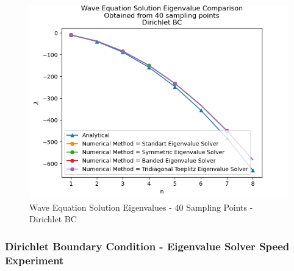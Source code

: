 \documentclass[letterpaper,12pt]{article}
\begin{document}
\begin{figure}[H]
\centerline{\includegraphics[width=\linewidth]{figures/2_40_d_eigenvalue.png}}
\caption{Wave Equation Solution Eigenvalues - 40 Sampling Points - Dirichlet BC}
\label{fig:2_40_d_eigenvalue}
\end{figure}
    

\subsubsection{Dirichlet Boundary Condition - Eigenvalue Solver Speed Experiment}
\end{document}
